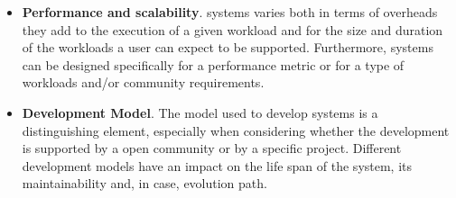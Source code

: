 \documentclass{sig-alternate}
\begin{document}
\begin{itemize}
\item \textbf{Performance and scalability}. \pilot systems varies both in
  terms of overheads they add to the execution of a given workload and for the
  size and duration of the workloads a user can expect to be supported.
  Furthermore, \pilot systems can be designed specifically for a performance
  metric or for a type of workloads and/or community requirements.

\item \textbf{Development Model}. The model used to develop \pilot systems is a
  distinguishing element, especially when considering whether the development
  is supported by a open community or by a specific project. Different
  development models have an impact on the life span of the \pilot system, its
  maintainability and, in case, evolution path.

\end{itemize}
\end{document}
